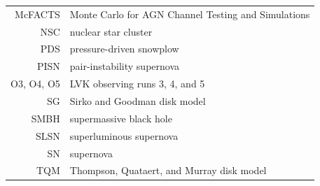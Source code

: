 \begin{center}
\begin{tabular}{rl}
McFACTS & Monte Carlo for AGN Channel Testing and Simulations \\
NSC & nuclear star cluster \\
PDS & pressure-driven snowplow \\
PISN & pair-instability supernova \\
O3, O4, O5 & LVK observing runs 3, 4, and 5 \\
SG & Sirko and Goodman disk model \\
SMBH & supermassive black hole \\
SLSN & superluminous supernova \\
SN & supernova \\
TQM & Thompson, Quataert, and Murray disk model \\
\end{tabular}


\end{center}


